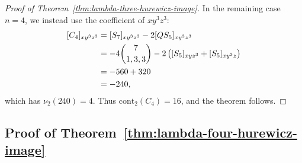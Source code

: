 \documentclass[a4paper]{amsart}
\theoremstyle{plain}
\theoremstyle{definition}
\newcommand{\cont}{\mathrm{cont}}
\begin{document}
\begin{proof}[Proof of Theorem~\ref{thm:lambda-three-hurewicz-image}]
	In the remaining case $n=4$, we instead use the coefficient of $xy^3z^3$:
	\[
		\begin{aligned}
			\relax [C_4]_{xy^3z^3}
			 & =[S_7]_{xy^3z^3}-2[Q S_5]_{xy^3z^3}                           \\
			 & =-4\binom{7}{1,3,3}-2\left([S_5]_{xyz^3}+[S_5]_{xy^3z}\right) \\
			 & =-560+320                                                     \\
			 & =-240,
		\end{aligned}
	\]
	which has $\nu_2(240)=4$. Thus $\cont_2(C_4)=16$, and the theorem follows.
\end{proof}

\subsection{Proof of Theorem~\ref{thm:lambda-four-hurewicz-image}}
\end{document}
